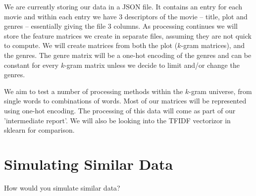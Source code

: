\documentclass[12pt]{article}
\begin{document}
We are currently storing our data in a JSON file. It contains an entry for each movie and within each entry we have 3 descriptors of the movie -- title, plot and genres -- essentially giving the file 3 columns. As processing continues we will store the feature matrices we create in separate files, assuming they are not quick to compute. We will create matrices from both the plot ($k$-gram matrices), and the genres. The genre matrix will be a one-hot encoding of the genres and can be constant for every $k$-gram matrix unless we decide to limit and/or change the genres.


We aim to test a number of processing methods within the $k$-gram universe, from single words to combinations of words. Most of our matrices will be represented using one-hot encoding. The processing of this data will come as part of our 'intermediate report'. We will also be looking into the TFIDF vectorizor in sklearn for comparison.

\section{Simulating Similar Data}
How would you simulate similar data?
\end{document}

